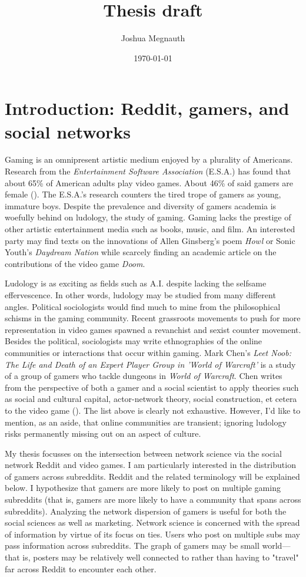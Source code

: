 \documentclass[12pt, a4paper]{article}
\title{Thesis draft}
\author{Joshua Megnauth}
\date{\today}
\begin{document}
\maketitle

\section{Introduction: Reddit, gamers, and social networks}
Gaming is an omnipresent artistic medium enjoyed by a plurality of Americans. Research from the \textit{Entertainment Software Association} (E.S.A.) has found that about 65\% of American adults play video games. About 46\% of said gamers are female (\cite{esagamers}). The E.S.A.'s research counters the tired trope of gamers as young, immature boys. Despite the prevalence and diversity of gamers academia is woefully behind on ludology, the study of gaming. Gaming lacks the prestige of other artistic entertainment media such as books, music, and film. An interested party may find texts on the innovations of Allen Ginsberg's poem \textit{Howl} or Sonic Youth's \textit{Daydream Nation} while scarcely finding an academic article on the contributions of the video game \textit{Doom}.

Ludology is as exciting as fields such as A.I. despite lacking the selfsame effervescence. In other words, ludology may be studied from many different angles. Political sociologists would find much to mine from the philosophical schisms in the gaming community. Recent grassroots movements to push for more representation in video games spawned a revanchist and sexist counter movement. Besides the political, sociologists may write ethnographies of the online communities or interactions that occur within gaming. Mark Chen's \textit{Leet Noob: The Life and Death of an Expert Player Group in 'World of Warcraft'} is a study of a group of gamers who tackle dungeons in \textit{World of Warcraft}. Chen writes from the perspective of both a gamer and a social scientist to apply theories such as social and cultural capital, actor-network theory, social construction, et cetera to the video game (\cite{chenwow}). The list above is clearly not exhaustive. However, I'd like to mention, as an aside, that online communities are transient; ignoring ludology risks permanently missing out on an aspect of culture.

My thesis focusses on the intersection between network science via the social network Reddit and video games. I am particularly interested in the distribution of gamers across subreddits. Reddit and the related terminology will be explained below. I hypothesize that gamers are more likely to post on multiple gaming subreddits (that is, gamers are more likely to have a community that spans across subreddits). Analyzing the network dispersion of gamers is useful for both the social sciences as well as marketing. Network science is concerned with the spread of information by virtue of its focus on ties. Users who post on multiple subs may pass information across subreddits. The graph of gamers may be small world---that is, posters may be relatively well connected to rather than having to "travel" far across Reddit to encounter each other.
\end{document}

